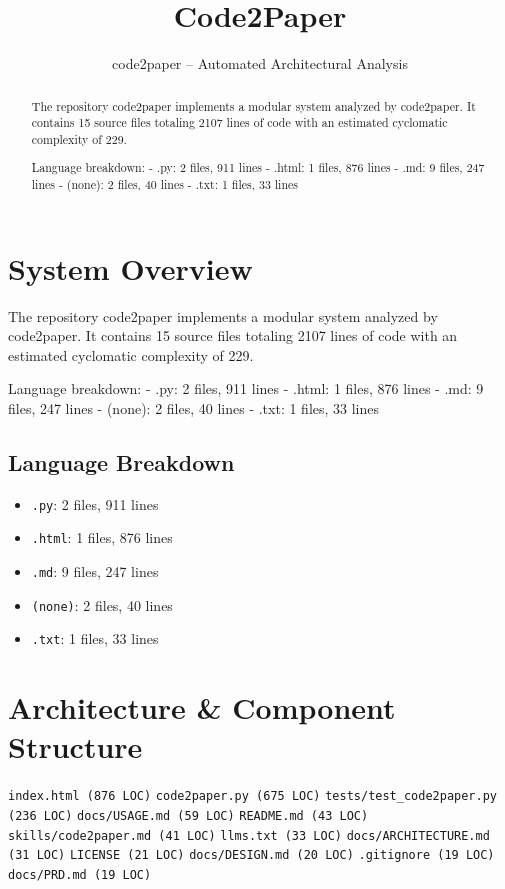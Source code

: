 \documentclass[11pt]{article}
\title{Code2Paper}
\author{code2paper -- Automated Architectural Analysis}
\date{}
\begin{document}
\maketitle

\begin{abstract}
The repository code2paper implements a modular system analyzed by code2paper. It contains 15 source files totaling 2107 lines of code with an estimated cyclomatic complexity of 229.

Language breakdown:
- .py: 2 files, 911 lines
- .html: 1 files, 876 lines
- .md: 9 files, 247 lines
- (none): 2 files, 40 lines
- .txt: 1 files, 33 lines
\end{abstract}

\section{System Overview}
The repository code2paper implements a modular system analyzed by code2paper. It contains 15 source files totaling 2107 lines of code with an estimated cyclomatic complexity of 229.

Language breakdown:
- .py: 2 files, 911 lines
- .html: 1 files, 876 lines
- .md: 9 files, 247 lines
- (none): 2 files, 40 lines
- .txt: 1 files, 33 lines

\subsection{Language Breakdown}
\begin{itemize}
\item \texttt{.py}: 2 files, 911 lines
\item \texttt{.html}: 1 files, 876 lines
\item \texttt{.md}: 9 files, 247 lines
\item \texttt{(none)}: 2 files, 40 lines
\item \texttt{.txt}: 1 files, 33 lines
\end{itemize}

\section{Architecture \& Component Structure}
\begin{itemize}
\texttt{index.html (876 LOC)}
\texttt{code2paper.py (675 LOC)}
\texttt{tests/test\_code2paper.py (236 LOC)}
\texttt{docs/USAGE.md (59 LOC)}
\texttt{README.md (43 LOC)}
\texttt{skills/code2paper.md (41 LOC)}
\texttt{llms.txt (33 LOC)}
\texttt{docs/ARCHITECTURE.md (31 LOC)}
\texttt{LICENSE (21 LOC)}
\texttt{docs/DESIGN.md (20 LOC)}
\texttt{.gitignore (19 LOC)}
\texttt{docs/PRD.md (19 LOC)}
\end{itemize}
\end{document}

